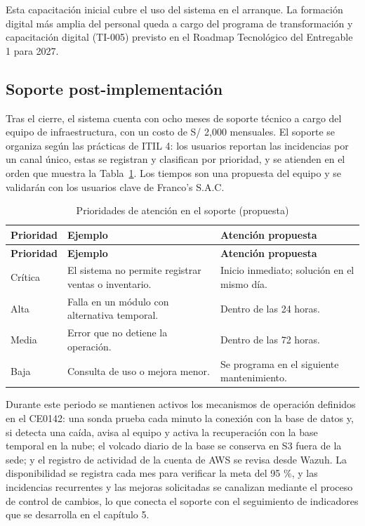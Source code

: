 Esta capacitación inicial cubre el uso del sistema en el arranque. La formación digital más amplia del personal queda a cargo del programa de transformación y capacitación digital (TI-005) previsto en el Roadmap Tecnológico del Entregable 1 para 2027.

\subsection{Soporte post-implementación}


Tras el cierre, el sistema cuenta con ocho meses de soporte técnico a cargo del equipo de infraestructura, con un costo de S/ 2,000 mensuales. El soporte se organiza según las prácticas de ITIL 4: los usuarios reportan las incidencias por un canal único, estas se registran y clasifican por prioridad, y se atienden en el orden que muestra la Tabla~\ref{tab:cap4-8}. Los tiempos son una propuesta del equipo y se validarán con los usuarios clave de Franco's S.A.C.


{\small
\renewcommand{\arraystretch}{1.3}
\begin{longtable}{|>{\raggedright\arraybackslash}p{1.30cm}|>{\raggedright\arraybackslash}p{7.50cm}|>{\raggedright\arraybackslash}p{6.20cm}|}
\caption{Prioridades de atención en el soporte (propuesta)}\label{tab:cap4-8}\\
\hline
\textbf{Prioridad} & \textbf{Ejemplo} & \textbf{Atención propuesta} \\
\hline
\endfirsthead
\hline
\textbf{Prioridad} & \textbf{Ejemplo} & \textbf{Atención propuesta} \\
\hline
\endhead
Crítica & El sistema no permite registrar ventas o inventario. & Inicio inmediato; solución en el mismo día. \\
\hline
Alta & Falla en un módulo con alternativa temporal. & Dentro de las 24 horas. \\
\hline
Media & Error que no detiene la operación. & Dentro de las 72 horas. \\
\hline
Baja & Consulta de uso o mejora menor. & Se programa en el siguiente mantenimiento. \\
\hline
\end{longtable}
}


Durante este periodo se mantienen activos los mecanismos de operación definidos en el CE0142: una sonda prueba cada minuto la conexión con la base de datos y, si detecta una caída, avisa al equipo y activa la recuperación con la base temporal en la nube; el volcado diario de la base se conserva en S3 fuera de la sede; y el registro de actividad de la cuenta de AWS se revisa desde Wazuh. La disponibilidad se registra cada mes para verificar la meta del 95 \%, y las incidencias recurrentes y las mejoras solicitadas se canalizan mediante el proceso de control de cambios, lo que conecta el soporte con el seguimiento de indicadores que se desarrolla en el capítulo 5.
